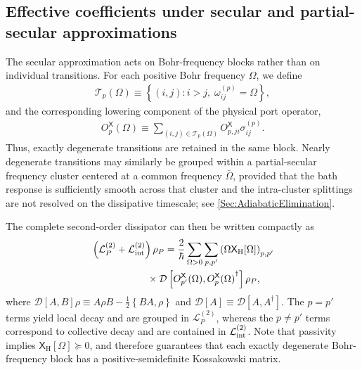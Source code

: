 \documentclass[prx,aps,twocolumn,article]{revtex4-2}
\newcommand{\msf}[1]{\mathsf{#1}}
\newcommand{\msXH}{\msX_\mathrm{H}}
\newcommand{\msX}{\msf{X}}
\begin{document}
\subsection{Effective coefficients under secular and partial-secular approximations}
The secular approximation acts on Bohr-frequency blocks rather than on
individual transitions. For each positive Bohr frequency $\Omega$, we
define
\begin{align}
    \mathcal T_p(\Omega)
    \equiv
    \left\{
        (i,j):
        i>j,\;
        \omega_{ij}^{(p)}=\Omega
    \right\},
\end{align}
and the corresponding lowering component of the physical port operator,
\begin{align}
    O_p^{\msX}(\Omega)
    \equiv
    \sum_{(i,j)\in\mathcal T_p(\Omega)}
    O_{p,ji}^{\msX}
    \sigma_{ij}^{(p)}.
\label{Eq:MainTransitionBlockOperator}
\end{align}
Thus, exactly degenerate transitions are retained in the same block. Nearly degenerate transitions may similarly be grouped within a partial-secular frequency cluster centered at a common frequency
$\bar\Omega$, provided that the bath response is sufficiently smooth across that cluster and the intra-cluster splittings are not resolved on the dissipative timescale; see \cref{Sec:AdiabaticElimination}.

The complete second-order dissipator can then be written compactly as
\begin{align}
\begin{aligned}
    &
    \left(
        \mathcal L_P^{(2)}
        +
        \mathcal L_{\rm int}^{(2)}
    \right)\rho_P
    =
    \frac{2}{\hbar}
    \sum_{\Omega>0}
    \sum_{p,p'}
    \left(
        \Omega\msXH[\Omega]
    \right)_{p,p'}
    \\
    &\hspace{20mm}\times
    \mathcal D
    \left[
        O_{p'}^{\msX}(\Omega),
        {O_p^{\msX}(\Omega)}^\dagger
    \right]
    \rho_P,
\end{aligned}
\label{Eq:MainSecularDissipator}
\end{align}
where $\mathcal D[A,B]\rho \equiv A\rho B  -\frac{1}{2}
\left\{BA,\rho \right\}$ and $\mathcal D[A]\equiv\mathcal D[A,A^\dagger]$. The $p=p'$ terms yield local decay and are grouped in $\mathcal L_P^{(2)}$, whereas the $p\neq p'$
terms correspond to collective decay and are contained in $\mathcal L_{\rm int}^{(2)}$. Note that passivity implies $\msXH[\Omega]\succeq0$, and therefore guarantees that each exactly degenerate Bohr-frequency block has a positive-semidefinite Kossakowski matrix.
\end{document}
